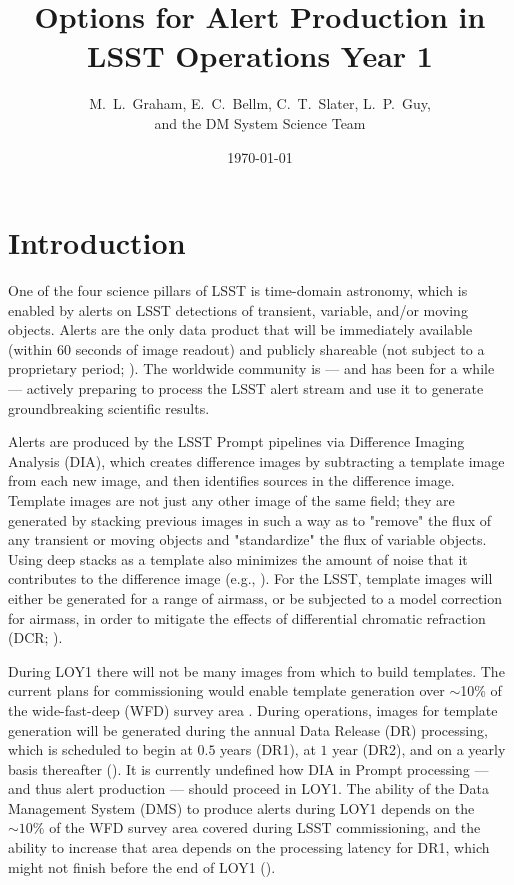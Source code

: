 \documentclass[DM,lsstdraft,toc]{lsstdoc}
\title[Alert Production in Year 1]{Options for Alert Production in \\ LSST Operations Year 1}
\author{M.~L.~Graham, E.~C.~Bellm, C.~T.~Slater, L.~P.~Guy, \\ and the DM System Science Team}
\date{\today}
\begin{document}
\maketitle

\section{Introduction} \label{sec:intro}

One of the four science pillars of LSST is time-domain astronomy, which is enabled by alerts on LSST detections of transient, variable, and/or moving objects. Alerts are the only data product that will be immediately available (within $60$ seconds of image readout) and publicly shareable (not subject to a proprietary period; ).
The worldwide community is --- and has been for a while --- actively preparing to process the LSST alert stream and use it to generate groundbreaking scientific results. 

Alerts are produced by the LSST Prompt pipelines via Difference Imaging Analysis (DIA), which creates difference images by subtracting a template image from each new image, and then identifies sources in the difference image.
Template images are not just any other image of the same field; they are generated by stacking previous images in such a way as to "remove" the flux of any transient or moving objects and "standardize" the flux of variable objects.
Using deep stacks as a template also minimizes the amount of noise that it contributes to the difference image (e.g., ).
For the LSST, template images will either be generated for a range of airmass, or be subjected to a model correction for airmass, in order to mitigate the effects of differential chromatic refraction (DCR; ).

During LOY1 there will not be many images from which to build templates.
The current plans for commissioning would enable template generation over $\sim$10\% of the wide-fast-deep (WFD) survey area .
During operations, images for template generation will be generated during the annual Data Release (DR) processing, which is scheduled to begin at $0.5$ years (DR1), at $1$ year (DR2), and on a yearly basis thereafter ().
It is currently undefined how DIA in Prompt processing --- and thus alert production --- should proceed in LOY1.
The ability of the Data Management System (DMS) to produce alerts during LOY1 depends on the $\sim10\%$ of the WFD survey area covered during LSST commissioning, and the ability to increase that area depends on the processing latency for DR1, which might not finish before the end of LOY1 ().  
\end{document}
